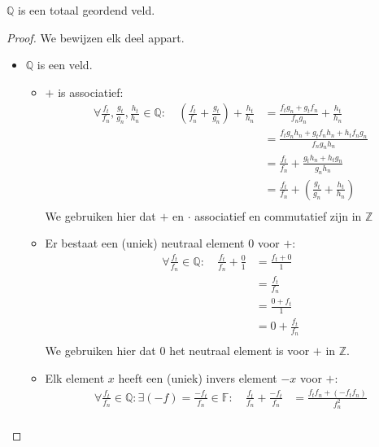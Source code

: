 \documentclass[main.tex]{subfiles}
\begin{document}
\begin{pr}
  $\mathbb{Q}$ is een totaal geordend veld.

  \begin{proof}
    We bewijzen elk deel appart.
    \begin{itemize}
    \item $\mathbb{Q}$ is een veld.
      \begin{itemize}
      \item $+$ is associatief:
        \[ 
        \begin{array}{rrl}
          \forall \frac{f_{t}}{f_{n}},\frac{g_{t}}{g_{n}},\frac{h_{t}}{h_{n}} \in \mathbb{Q}:\
          &\left(\frac{f_{t}}{f_{n}} + \frac{g_{t}}{g_{n}}\right) + \frac{h_{t}}{h_{n}}
          &= \frac{f_{t}g_{n} + g_{t}f_{n}}{f_{n}g_{n}} + \frac{h_{t}}{h_{n}}\\
          &&= \frac{f_{t}g_{n}h_{n} + g_{t}f_{n}h_{n} + h_{t}f_{n}g_{n}}{f_{n}g_{n}h_{n}}\\
          &&=  \frac{f_{t}}{f_{n}} + \frac{g_{t}h_{n} + h_{t}g_{n}}{g_{n}h_{n}}\\
          &&= \frac{f_{t}}{f_{n}} + \left(\frac{g_{t}}{g_{n}} + \frac{h_{t}}{h_{n}}\right)\\
        \end{array}
        \]
        We gebruiken hier dat $+$ en $\cdot$ associatief en commutatief zijn in $\mathbb{Z}$
      \item Er bestaat een (uniek) neutraal element $0$ voor $+$:
        \[
        \begin{array}{rrl}
          \forall \frac{f_{t}}{f_{n}}\in \mathbb{Q}:\
          &\frac{f_{t}}{f_{n}} + \frac{0}{1}
          &= \frac{f_{t} + 0}{1}\\
          &&= \frac{f_{t}}{f_{n}}\\
          &&= \frac{0 + f_{t}}{1}\\
          &&= 0 +  \frac{f_{t}}{f_{n}}\\
        \end{array}
        \]
        We gebruiken hier dat $0$ het neutraal element is voor $+$ in $\mathbb{Z}$.
      \item Elk element $x$ heeft een (uniek) invers element $-x$ voor $+$:
        \[
        \begin{array}{rrl}
          \forall \frac{f_{t}}{f_{n}}\in \mathbb{Q}: \exists (-f) = \frac{-f_{t}}{f_{n}} \in \mathbb{F}: \ 
          &\frac{f_{t}}{f_{n}} + \frac{-f_{t}}{f_{n}}
          &= \frac{f_{t}f_{n} + (-f_{t}f_{n})}{f_{n}^{2}}\\

\end{array}\]
\end{itemize}
\end{itemize}
\end{proof}
\end{pr}
\end{document}
